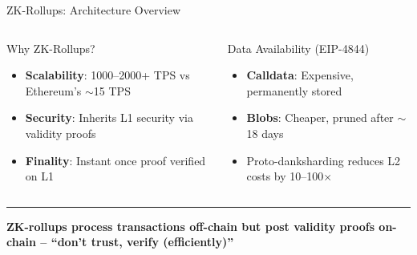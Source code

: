 \documentclass[8pt,aspectratio=169]{beamer}
\newcommand{\bottomnote}[1]{\vfill\vspace{-2mm}\textcolor{mllavender2}{\rule{\textwidth}{0.4pt}}\vspace{1mm}\footnotesize\textbf{#1}}
\begin{document}
\begin{frame}{ZK-Rollups: Architecture Overview}
\begin{center}
\begin{tikzpicture}[scale=0.72, every node/.style={font=\tiny},
  bx/.style={rounded corners, draw=mlpurple, minimum width=2cm, minimum height=0.7cm, align=center, line width=0.5pt}]
\end{tikzpicture}
\end{center}
\vspace{0.1cm}
\begin{columns}[T]
\begin{block}{\footnotesize Why ZK-Rollups?}
\footnotesize
\begin{itemize}
\item \textbf{Scalability}: 1000--2000+ TPS vs Ethereum's $\sim$15 TPS
\item \textbf{Security}: Inherits L1 security via validity proofs
\item \textbf{Finality}: Instant once proof verified on L1
\end{itemize}
\end{block}
\begin{block}{\footnotesize Data Availability (EIP-4844)}
\footnotesize
\begin{itemize}
\item \textbf{Calldata}: Expensive, permanently stored
\item \textbf{Blobs}: Cheaper, pruned after $\sim$18 days
\item Proto-danksharding reduces L2 costs by 10--100$\times$
\end{itemize}
\end{block}
\end{columns}
\bottomnote{ZK-rollups process transactions off-chain but post validity proofs on-chain -- ``don't trust, verify (efficiently)''}
\end{frame}
\end{document}
